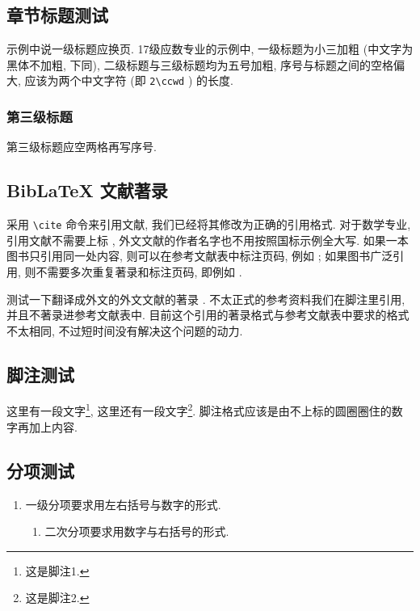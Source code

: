 \subsection{章节标题测试}

示例中说一级标题应换页. 17级应数专业的示例中, 一级标题为小三加粗 (中文字为黑体不加粗, 下同), 二级标题与三级标题均为五号加粗, 序号与标题之间的空格偏大, 应该为两个中文字符 (即 \verb|2\ccwd| ) 的长度.

\subsubsection{第三级标题}

第三级标题应空两格再写序号.

\zhlipsum[1]

\subsection{BibLaTeX 文献著录}

采用 \verb|\cite| 命令来引用文献, 我们已经将其修改为正确的引用格式. 对于数学专业, 引用文献不需要上标 \cite{atiyah_introduction_1969}, 外文文献的作者名字也不用按照国标示例全大写. 如果一本图书只引用同一处内容, 则可以在参考文献表中标注页码, 例如 \cite{herrlich_axiom_2006}; 如果图书广泛引用, 则不需要多次重复著录和标注页码, 即例如 \cite{atiyah_introduction_1969}.






测试一下翻译成外文的外文文献的著录 \cite{sally_history_1985}. 不太正式的参考资料我们在脚注里引用, 并且不著录进参考文献表中. 目前这个引用的著录格式与参考文献表中要求的格式不太相同, 不过短时间没有解决这个问题的动力.

\zhlipsum[1]

\subsection{脚注测试}

这里有一段文字\footnote{这是脚注1.}, 这里还有一段文字\footnote{这是脚注2.}. 脚注格式应该是由不上标的圆圈圈住的数字再加上内容.

\zhlipsum

\subsection{分项测试}

\begin{enumerate}
  \item 一级分项要求用左右括号与数字的形式.
  \begin{enumerate}
    \item 二次分项要求用数字与右括号的形式.
  \end{enumerate}
\end{enumerate}

\zhlipsum[1]
